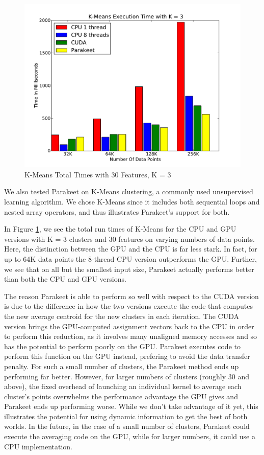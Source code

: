 \documentclass[10pt,twocolumn]{article}
\begin{document}
\begin{figure}
\includegraphics[scale=0.4]{KMCPUK3.pdf}
\caption{K-Means Total Times with 30 Features, K = 3}
\label{KMCPU3}
\end{figure}

We also tested Parakeet on K-Means clustering, a commonly used unsupervised learning algorithm.  We chose K-Means since it includes both sequential loops and nested array operators, and thus illustrates Parakeet's support for both.

In Figure \ref{KMCPU3}, we see the total run times of K-Means for the CPU and GPU versions with K = 3 clusters and 30 features on varying numbers of data points.  Here, the distinction between the GPU and the CPU is far less stark.  In fact, for up to 64K data points the 8-thread CPU version outperforms the GPU.  Further, we see that on all but the smallest input size, Parakeet actually performs better than both the CPU and GPU versions.

The reason Parakeet is able to perform so well with respect to the CUDA version is due to the difference in how the two versions execute the code that computes the new average centroid for the new clusters in each iteration.  The CUDA version brings the GPU-computed assignment vectors back to the CPU in order to perform this reduction, as it involves many unaligned memory accesses and so has the potential to perform poorly on the GPU.  Parakeet executes code to perform this function on the GPU instead, prefering to avoid the data transfer penalty.  For such a small number of clusters, the Parakeet method ends up performing far better.  However, for larger numbers of clusters (roughly 30 and above), the fixed overhead of launching an individual kernel to average each cluster's points overwhelms the performance advantage the GPU gives and Parakeet ends up performing worse.  While we don't take advantage of it yet, this illustrates the potential for using dynamic information to get the best of both worlds.  In the future, in the case of a small number of clusters, Parakeet could execute the averaging code on the GPU, while for larger numbers, it could use a CPU implementation.
\end{document}
